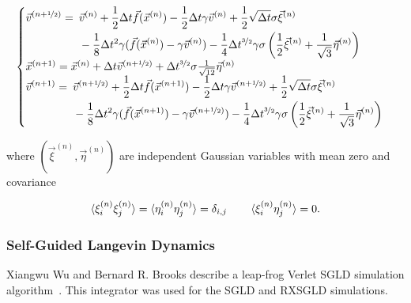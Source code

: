 \documentclass[a4paper]{article}
\begin{document}
\begin{equation}
\begin{cases}
\begin{aligned}[t]\arraycolsep=0pt
\vec{v}^{(n+\nicefrac{1}{2})} = \enspace &  \vec{v}^{(n)} + \frac{1}{2} \Delta t \vec{f}(\vec{x}^{(n)}) - \frac{1}{2} \Delta t \gamma \vec{v}^{(n)} + \frac{1}{2} \sqrt{\Delta t} \sigma \vec{\xi}^{(n)} \\ &
- \frac{1}{8} \Delta t^2 \gamma (\vec{f}(\vec{x}^{(n)}) - \gamma \vec{v}^{(n)}) - \frac{1}{4} \Delta t^{\nicefrac{3}{2}} \gamma \sigma \left(\frac{1}{2} \vec{\xi}^{(n)} + \frac{1}{\sqrt{3}} \vec{\eta}^{(n)}\right)
\end{aligned} \\
\vec{x}^{(n+1)} = \vec{x}^{(n)} + \Delta t \vec{v}^{(n + \nicefrac{1}{2})} + \Delta t^{\nicefrac{3}{2}} \sigma \frac{1}{\sqrt{12}} \vec{\eta}^{(n)} \\
\begin{aligned}[t]\arraycolsep=0pt
\vec{v}^{(n+1)} = \enspace &  \vec{v}^{(n + \nicefrac{1}{2})} + \frac{1}{2} \Delta t \vec{f}(\vec{x}^{(n+1)}) - \frac{1}{2} \Delta t \gamma \vec{v}^{(n + \nicefrac{1}{2})} + \frac{1}{2} \sqrt{\Delta t} \sigma \vec{\xi}^{(n)} \\ &
- \frac{1}{8} \Delta t^2 \gamma (\vec{f}(\vec{x}^{(n+1)}) - \gamma \vec{v}^{(n + \nicefrac{1}{2})}) - \frac{1}{4} \Delta t^{\nicefrac{3}{2}} \gamma \sigma \left(\frac{1}{2} \vec{\xi}^{(n)} + \frac{1}{\sqrt{3}} \vec{\eta}^{(n)}\right)
\end{aligned} 
\end{cases}
\label{eq:final_integrator}
\end{equation}

where $(\vec{\xi}^{(n)}, \vec{\eta}^{(n)})$ are independent Gaussian variables with mean zero and covariance

\begin{equation}
\braket{\xi_i^{(n)} \xi_j^{(n)}} = \braket{\eta_i^{(n)} \eta_j^{(n)}} = \delta_{i,j} \qquad \braket{\xi_i^{(n)} \eta_j^{(n)}} = 0.
\end{equation}

\subsubsection{Self-Guided Langevin Dynamics}

Xiangwu Wu and Bernard R. Brooks describe a leap-frog Verlet SGLD simulation algorithm~\cite{XiongwuWu2011a}. This integrator was used for the SGLD and RXSGLD simulations.
\end{document}
